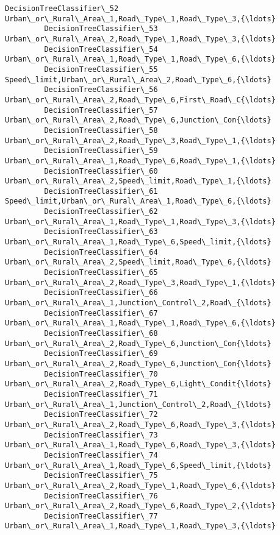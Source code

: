 \documentclass[11pt]{article}
\begin{document}
\begin{Verbatim}[commandchars=\\\{\}]
         DecisionTreeClassifier\_52   Urban\_or\_Rural\_Area\_1,Road\_Type\_1,Road\_Type\_3,{\ldots}   
         DecisionTreeClassifier\_53   Urban\_or\_Rural\_Area\_2,Road\_Type\_1,Road\_Type\_3,{\ldots}   
         DecisionTreeClassifier\_54   Urban\_or\_Rural\_Area\_1,Road\_Type\_1,Road\_Type\_6,{\ldots}   
         DecisionTreeClassifier\_55   Speed\_limit,Urban\_or\_Rural\_Area\_2,Road\_Type\_6,{\ldots}   
         DecisionTreeClassifier\_56   Urban\_or\_Rural\_Area\_2,Road\_Type\_6,First\_Road\_C{\ldots}   
         DecisionTreeClassifier\_57   Urban\_or\_Rural\_Area\_2,Road\_Type\_6,Junction\_Con{\ldots}   
         DecisionTreeClassifier\_58   Urban\_or\_Rural\_Area\_2,Road\_Type\_3,Road\_Type\_1,{\ldots}   
         DecisionTreeClassifier\_59   Urban\_or\_Rural\_Area\_1,Road\_Type\_6,Road\_Type\_1,{\ldots}   
         DecisionTreeClassifier\_60   Urban\_or\_Rural\_Area\_2,Speed\_limit,Road\_Type\_1,{\ldots}   
         DecisionTreeClassifier\_61   Speed\_limit,Urban\_or\_Rural\_Area\_1,Road\_Type\_6,{\ldots}   
         DecisionTreeClassifier\_62   Urban\_or\_Rural\_Area\_1,Road\_Type\_1,Road\_Type\_3,{\ldots}   
         DecisionTreeClassifier\_63   Urban\_or\_Rural\_Area\_1,Road\_Type\_6,Speed\_limit,{\ldots}   
         DecisionTreeClassifier\_64   Urban\_or\_Rural\_Area\_2,Speed\_limit,Road\_Type\_6,{\ldots}   
         DecisionTreeClassifier\_65   Urban\_or\_Rural\_Area\_2,Road\_Type\_3,Road\_Type\_1,{\ldots}   
         DecisionTreeClassifier\_66   Urban\_or\_Rural\_Area\_1,Junction\_Control\_2,Road\_{\ldots}   
         DecisionTreeClassifier\_67   Urban\_or\_Rural\_Area\_1,Road\_Type\_1,Road\_Type\_6,{\ldots}   
         DecisionTreeClassifier\_68   Urban\_or\_Rural\_Area\_2,Road\_Type\_6,Junction\_Con{\ldots}   
         DecisionTreeClassifier\_69   Urban\_or\_Rural\_Area\_2,Road\_Type\_6,Junction\_Con{\ldots}   
         DecisionTreeClassifier\_70   Urban\_or\_Rural\_Area\_2,Road\_Type\_6,Light\_Condit{\ldots}   
         DecisionTreeClassifier\_71   Urban\_or\_Rural\_Area\_1,Junction\_Control\_2,Road\_{\ldots}   
         DecisionTreeClassifier\_72   Urban\_or\_Rural\_Area\_2,Road\_Type\_6,Road\_Type\_3,{\ldots}   
         DecisionTreeClassifier\_73   Urban\_or\_Rural\_Area\_1,Road\_Type\_6,Road\_Type\_3,{\ldots}   
         DecisionTreeClassifier\_74   Urban\_or\_Rural\_Area\_1,Road\_Type\_6,Speed\_limit,{\ldots}   
         DecisionTreeClassifier\_75   Urban\_or\_Rural\_Area\_2,Road\_Type\_1,Road\_Type\_6,{\ldots}   
         DecisionTreeClassifier\_76   Urban\_or\_Rural\_Area\_2,Road\_Type\_6,Road\_Type\_2,{\ldots}   
         DecisionTreeClassifier\_77   Urban\_or\_Rural\_Area\_1,Road\_Type\_1,Road\_Type\_3,{\ldots}   

\end{Verbatim}
\end{document}
